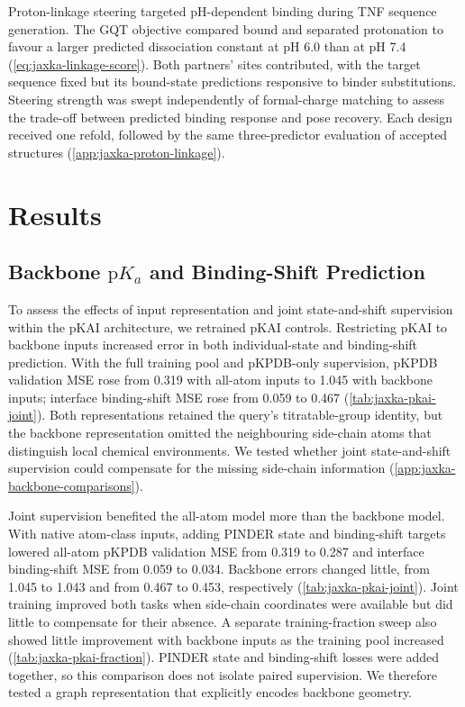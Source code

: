 Proton-linkage steering targeted pH-dependent binding during TNF sequence generation. The GQT objective compared bound and separated protonation to favour a larger predicted dissociation constant at pH 6.0 than at pH 7.4 (\cref{eq:jaxka-linkage-score}). Both partners' sites contributed, with the target sequence fixed but its bound-state predictions responsive to binder substitutions. Steering strength was swept independently of formal-charge matching to assess the trade-off between predicted binding response and pose recovery. Each design received one refold, followed by the same three-predictor evaluation of accepted structures (\cref{app:jaxka-proton-linkage}).

\section{Results}
\label{sec:jaxka-results}

\subsection{Backbone \texorpdfstring{$\mathrm{p}K_a$}{pKa} and Binding-Shift Prediction}
\label{sec:jaxka-backbone-results}

To assess the effects of input representation and joint state-and-shift supervision within the pKAI architecture, we retrained pKAI controls. Restricting pKAI to backbone inputs increased error in both individual-state and binding-shift prediction. With the full training pool and pKPDB-only supervision, pKPDB validation MSE rose from 0.319 with all-atom inputs to 1.045 with backbone inputs; interface binding-shift MSE rose from 0.059 to 0.467 (\cref{tab:jaxka-pkai-joint}). Both representations retained the query's titratable-group identity, but the backbone representation omitted the neighbouring side-chain atoms that distinguish local chemical environments. We tested whether joint state-and-shift supervision could compensate for the missing side-chain information (\cref{app:jaxka-backbone-comparisons}).

Joint supervision benefited the all-atom model more than the backbone model. With native atom-class inputs, adding PINDER state and binding-shift targets lowered all-atom pKPDB validation MSE from 0.319 to 0.287 and interface binding-shift MSE from 0.059 to 0.034. Backbone errors changed little, from 1.045 to 1.043 and from 0.467 to 0.453, respectively (\cref{tab:jaxka-pkai-joint}). Joint training improved both tasks when side-chain coordinates were available but did little to compensate for their absence. A separate training-fraction sweep also showed little improvement with backbone inputs as the training pool increased (\cref{tab:jaxka-pkai-fraction}). PINDER state and binding-shift losses were added together, so this comparison does not isolate paired supervision. We therefore tested a graph representation that explicitly encodes backbone geometry.

